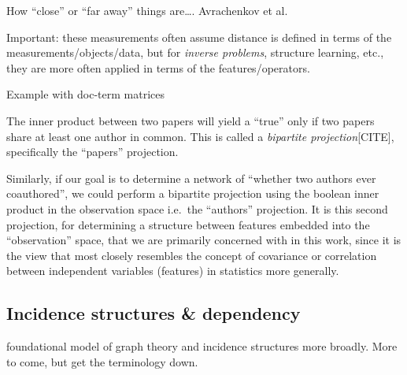 \documentclass[%
	12pt,
		oneside,
		letterpaper
]{book}
\begin{document}
How ``close'' or ``far away'' things are\ldots. Avrachenkov et al.~

Important: these measurements often assume distance is defined in terms
of the measurements/objects/data, but for \emph{inverse problems},
structure learning, etc., they are more often applied in terms of the
features/operators.

Example with doc-term matrices

The inner product between two papers will yield a ``true'' only if two
papers share at least one author in common. This is called a
\emph{bipartite projection}{[}CITE{]}, specifically the ``papers''
projection.

Similarly, if our goal is to determine a network of ``whether two
authors ever coauthored'', we could perform a bipartite projection using
the boolean inner product in the observation space i.e.~the ``authors''
projection. It is this second projection, for determining a structure
between features embedded into the ``observation'' space, that we are
primarily concerned with in this work, since it is the view that most
closely resembles the concept of covariance or correlation between
independent variables (features) in statistics more generally.

\subsection{Incidence structures \&
dependency}\label{incidence-structures-dependency}

foundational model of graph theory and incidence structures more
broadly. More to come, but get the terminology down.
\end{document}
